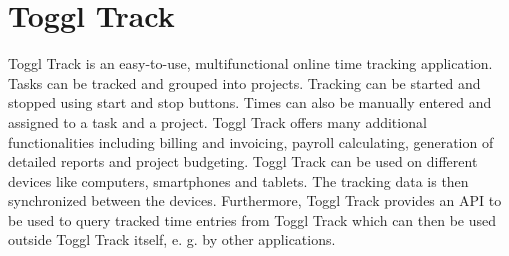 \section{Toggl Track}
Toggl Track is an easy-to-use, multifunctional online time tracking application. Tasks can be tracked and grouped
into projects. Tracking can be started and stopped using start and stop buttons. Times can also be manually entered
and assigned to a task and a project. Toggl Track offers many additional functionalities including billing and invoicing,
payroll calculating, generation of detailed reports and project budgeting. Toggl Track can be used on different devices 
like computers, smartphones and tablets. The tracking data is then synchronized between the devices. Furthermore, Toggl 
Track provides an API to be used to query tracked time entries from Toggl Track which can then be used outside Toggl Track 
itself, e. g. by other applications. \cite{bachelorarbeit_Egger_Verstappen_page8} \cite{toggl_track_url}
